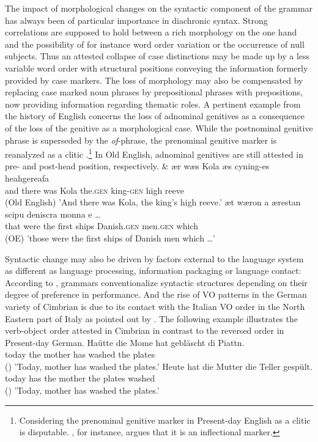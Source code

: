 \documentclass[output=paper
	        ,collection
	        ,collectionchapter
 	        ,biblatex
                ,babelshorthands
                ,newtxmath
                ,draftmode
                ,colorlinks, citecolor=brown
]{./langsci/langscibook}
\begin{document}
The impact of morphological changes on the syntactic component of the grammar has always been of particular importance in diachronic syntax. Strong correlations are supposed to hold between a rich morphology on the one hand and the possibility of for instance word order variation or the occurrence of null subjects. Thus an attested collapse of case distinctions may be made up by a less variable word order with structural positions conveying the information formerly provided by case markers. The loss of morphology may also be compensated by replacing case marked noun phrases by prepositional phrases with prepositions, now providing information regarding thematic roles. A pertinent example from the history of English concerns the loss of adnominal genitives as a consequence of the loss of the genitive as a morphological case. While the postnominal genitive phrase is superseded by the \textit{of}-phrase, the prenominal genitive marker is reanalyzed as a clitic \citep{allen2006}.\footnote{Considering the prenominal genitive marker in Present-day English as a clitic is disputable. \cite{zwicky1987}, for instance, argues that it is an inflectional marker.} In Old English, adnominal genitives are still attested in pre- and post-head position, respectively. 
\eal
\ex
\gll \& \th ær wæs Kola \dh æs cyning-es heahgereafa \\ and there was Kola the.\textsc{gen} king-\textsc{gen} {high reeve}  \\ \hfill (Old English)
\glt 'And there was Kola, the king's high reeve.' 
\ex
\gll \th æt wæron \th a ærestan scipu deniscra monna \th e \dots \\ that were the first ships Danish.\textsc{gen} men.\textsc{gen} which \\ \hfill (OE)
\glt 'those were the first ships of Danish men which \dots'
\zl

Syntactic change may also be driven by factors external to the language system as different as language processing, information packaging or language contact: According to \cite{hawkins2004}, grammars conventionalize syntactic structures depending on their degree of preference in performance. And the rise of VO patterns in the German variety of Cimbrian is due to its contact with the Italian VO order in the North Eastern part of Italy as pointed out by \cite{GrPo2005}. The following example illustrates the verb-object order attested in Cimbrian in contrast to the reversed order in Present-day German.
\eal
\ex
\gll Haütte die Mome hat gebläscht di Piattn.  \\ today the mother has washed the plates \\ \hfill ()
\glt 'Today, mother has washed the plates.' 
\ex 
\gll Heute hat die Mutter die Teller gespült.  \\ today has the mother the plates washed \\ \hfill ()
\glt 'Today, mother has washed the plates.' 
\zl
\end{document}

